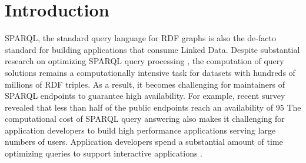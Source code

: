 \section{Introduction}
SPARQL, the standard query language for RDF graphs is also the de-facto standard for building applications that consume Linked Data. 
Despite substantial research on optimizing SPARQL query processing \cite{Pham2013}, the computation of query solutions remains a computationally intensive task for datasets with hundreds of millions of RDF triples.
As a result, it becomes challenging for maintainers of SPARQL endpoints to guarantee high availability.
For example, recent survey \cite{buil2013sparql} revealed that less than half of the public endpoints reach an availability of 95%
The computational cost of SPARQL query answering also makes it challenging for application developers to build high performance applications serving large numbers of users.
Application developers spend a substantial amount of time optimizing queries to support interactive applications \cite{Loizou_Angles_Groth_2014}.